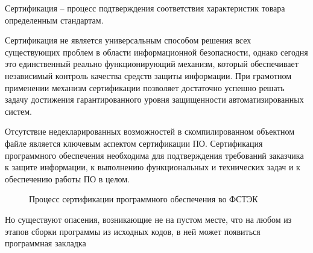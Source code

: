 Сертификация -- процесс подтверждения соответствия характеристик товара определенным стандартам.

Сертификация не является универсальным способом 
решения всех существующих проблем в 
области информационной безопасности, однако 
сегодня это единственный реально функционирующий 
механизм, который обеспечивает независимый 
контроль качества средств защиты информации.
При грамотном применении механизм сертификации 
позволяет достаточно успешно решать задачу 
достижения гарантированного уровня защищенности автоматизированных систем.

{\actuality} Отсутствие недекларированных возможностей в скомпилированном
объектном файле является ключевым аспектом сертификации ПО.
Сертификация программного обеспечения необходима для 
подтверждения требований заказчика к защите 
информации, к выполнению функциональных 
и технических задач и к обеспечению работы ПО в целом.

\begin{figure}[!htbp]
    \caption{Процесс сертификации программного обеспечения во ФСТЭК\label{fig:fstak-cert}}
\end{figure}

Но существуют опасения, возникающие не на пустом месте,
что на любом из этапов сборки программы из
исходных кодов, в ней может появиться программная 
закладка \autocite{compile-a-virus, ken-thompson-hack}

